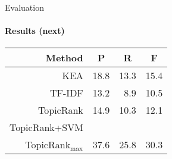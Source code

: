   \begin{frame}{Evaluation}
    \framesubtitle{Results (next)}

    \begin{center}
      \begin{tabular}{|r|rrr|}
        \hline
        Method & \multicolumn{1}{c}{P} & \multicolumn{1}{c}{R} & \multicolumn{1}{c|}{F}\\
        \hline
        KEA           & 18.8 & 13.3 & 15.4\\
        TF-IDF        & 13.2 & 8.9 & 10.5\\
        TopicRank     & 14.9 & 10.3 & 12.1\\
        TopicRank+SVM & \cellcolor{pink}{24.2} & \cellcolor{pink}{16.7} & \cellcolor{pink}{19.6}\\
        \hline
        TopicRank$_{\text{max}}$   & 37.6 & 25.8 & 30.3\\
        \hline
      \end{tabular}
    \end{center}

  \end{frame}

